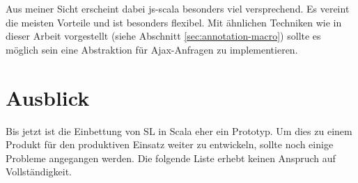 \documentclass[12pt,bibtotoc]{scrreprt}
\begin{document}
Aus meiner Sicht erscheint dabei js-scala besonders viel versprechend. Es vereint die meisten Vorteile und ist besonders flexibel. Mit ähnlichen Techniken wie in dieser Arbeit vorgestellt (siehe Abschnitt \ref{sec:annotation-macro}) sollte es möglich sein eine Abstraktion für Ajax-Anfragen zu implementieren.

\chapter{Ausblick}
\label{sec:future-works}

Bis jetzt ist die Einbettung von SL in Scala eher ein Prototyp. Um dies zu einem Produkt für den produktiven Einsatz weiter zu entwickeln, sollte noch einige Probleme angegangen werden. Die folgende Liste erhebt keinen Anspruch auf Vollständigkeit. 
\end{document}
